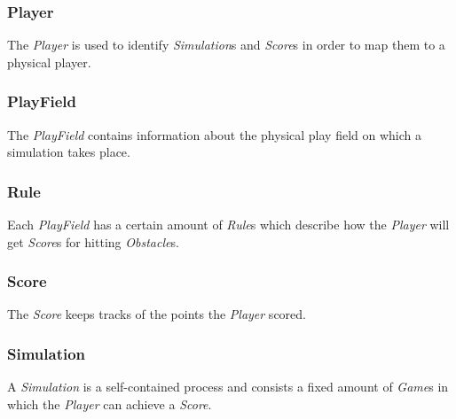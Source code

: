 \documentclass[fontsize=12pt,
               paper=a4,
               twoside=false,
               parskip=half,
               ]{scrartcl}
\begin{document}
\subsubsection{Player}
The \emph{Player} is used to identify \emph{Simulation}s and \emph{Score}s in order to map them to a physical player.

\subsubsection{PlayField}
The \emph{PlayField} contains information about the physical play field on which a simulation takes place.

\subsubsection{Rule}
Each \emph{PlayField} has a certain amount of \emph{Rule}s which describe how the \emph{Player} will get \emph{Score}s for hitting \emph{Obstacle}s.

\subsubsection{Score}
The \emph{Score} keeps tracks of the points the \emph{Player} scored.

\subsubsection{Simulation}
A \emph{Simulation} is a self-contained process and consists a fixed amount of \emph{Game}s in which the \emph{Player} can achieve a \emph{Score}. 
\end{document}

